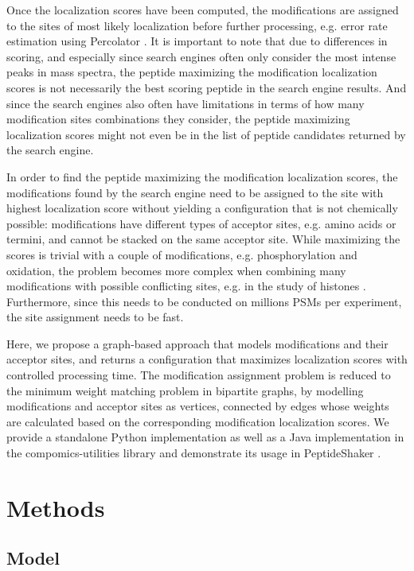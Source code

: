 \documentclass[]{article}
\begin{document}
Once the localization scores have been computed, the modifications are assigned to the sites of most likely localization before further processing, e.g. error rate estimation using Percolator \cite{Percolator}. It is important to note that due to differences in scoring, and especially since search engines often only consider the most intense peaks in mass spectra, the peptide maximizing the modification localization scores is not necessarily the best scoring peptide in the search engine results. And since the search engines also often have limitations in terms of how many modification sites combinations they consider, the peptide maximizing localization scores might not even be in the list of peptide candidates returned by the search engine.

In order to find the peptide maximizing the modification localization scores, the modifications found by the search engine need to be assigned to the site with highest localization score without yielding a configuration that is not chemically possible: modifications have different types of acceptor sites, e.g. amino acids or termini, and cannot be stacked on the same acceptor site. While maximizing the scores is trivial with a couple of modifications, e.g. phosphorylation and oxidation, the problem becomes more complex when combining many modifications with possible conflicting sites, e.g. in the study of histones \cite{Histone_study}. Furthermore, since this needs to be conducted on millions PSMs per experiment, the site assignment needs to be fast.

Here, we propose a graph-based approach that models modifications and their acceptor sites, and returns a configuration that maximizes localization scores with controlled processing time. The modification assignment problem is reduced to the minimum weight matching problem in bipartite graphs, by modelling modifications and acceptor sites as vertices, connected by edges whose weights are calculated based on the corresponding modification localization scores. We provide a standalone Python implementation as well as a Java implementation in the compomics-utilities library \cite{compomics} and demonstrate its usage in PeptideShaker \cite{PeptideShaker}.

\section{Methods}

\subsection{Model}
\end{document}
